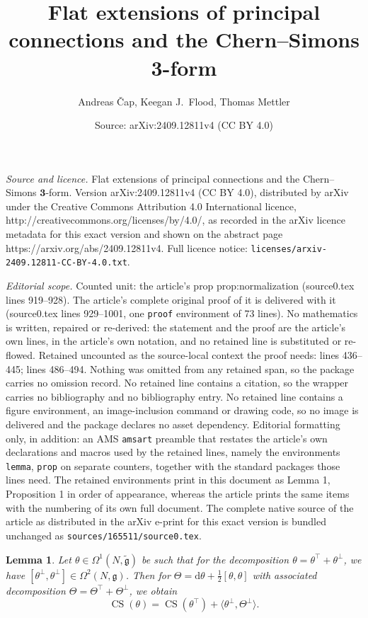 \documentclass[10pt,a4paper]{amsart}
\title{Flat extensions of principal connections and the Chern--Simons $\boldsymbol{3}$-form}
\author{Andreas {\v{C}}ap, Keegan J.~Flood, Thomas Mettler}
\date{Source: arXiv:2409.12811v4 (CC BY 4.0)}
\newtheorem{lemma}{Lemma}
\newcommand{\B}[2]{\langle#1,#2\rangle}
\newcommand{\CS}{\operatorname{CS}}
\newcommand{\Om}{\Omega}
\renewcommand*{\d}{\mathrm{d}}
\renewcommand{\th}{\theta}
\begin{document}
\maketitle

\noindent\emph{Source and licence.} Flat extensions of principal connections and the Chern--Simons $\boldsymbol{3}$-form. Version arXiv:2409.12811v4 (CC BY 4.0), distributed by arXiv under the Creative Commons Attribution 4.0 International licence, http://creativecommons.org/licenses/by/4.0/, as recorded in the arXiv licence metadata for this exact version and shown on the abstract page https://arxiv.org/abs/2409.12811v4. Full licence notice: \texttt{licenses/arxiv-2409.12811-CC-BY-4.0.txt}.\par\smallskip

\noindent\textit{Editorial scope.} Counted unit: the article's prop prop:normalization (source0.tex lines 919--928). The article's complete original proof of it is delivered with it (source0.tex lines 929--1001, one \texttt{proof} environment of 73 lines). No mathematics is written, repaired or re-derived: the statement and the proof are the article's own lines, in the article's own notation, and no retained line is substituted or re-flowed.  Retained uncounted as the source-local context the proof needs: lines 436--445; lines 486--494.  Nothing was omitted from any retained span, so the package carries no omission record.  No retained line contains a citation, so the wrapper carries no bibliography and no bibliography entry.  No retained line contains a figure environment, an image-inclusion command or drawing code, so no image is delivered and the package declares no asset dependency.  Editorial formatting only, in addition: an AMS \texttt{amsart} preamble that restates the article's own declarations and macros used by the retained lines, namely the environments \texttt{lemma}, \texttt{prop} on separate counters, together with the standard packages those lines need.  The retained environments print in this document as Lemma 1, Proposition 1 in order of appearance, whereas the article prints the same items with the numbering of its own full document.  The complete native source of the article as distributed in the arXiv e-print for this exact version is bundled unchanged as \texttt{sources/165511/source0.tex}.
\begin{lemma}\label{lem:CS-pairs}
Let $\th\in\Om^1(N,\mathfrak{\tilde{g}})$ be such that for the decomposition
$\th=\th^\top+\th^\perp$, we have
$[\th^\perp,\th^\perp]\in\Om^2(N,\mathfrak{g})$. Then for
$\Theta=\d\th+\frac12[\th,\th]$ with associated decomposition
$\Theta=\Theta^\top+\Theta^\perp$, we obtain
\begin{equation}\label{eqn:partialblindness}
\CS(\th)=\CS(\th^\top)+\B{\th^\perp}{\Theta^\perp}. 
\end{equation}
\end{lemma}
\end{document}
